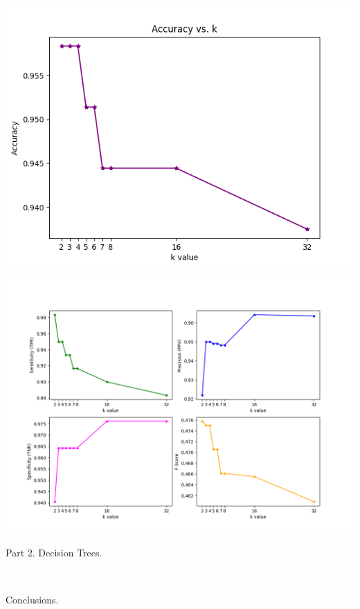 \documentclass[12pt, letterpaper]{article}
\begin{document}
\begin{enumerate}[label=\Roman*.]
\begin{enumerate}[label=\arabic*.]
	\begin{center}
	 	\includegraphics[scale=0.7]{../images/accuracy.png} 
	\end{center}
	\end{enumerate}
	\includegraphics[scale=0.65]{../images/metrics.png} 

	
	{\bf \item Part 2. Decision Trees. }\\
	
	{\bf \item Conclusions.}\\
	  
	  
\end{enumerate}
	
	
	
	
	
	
	
\end{document}
